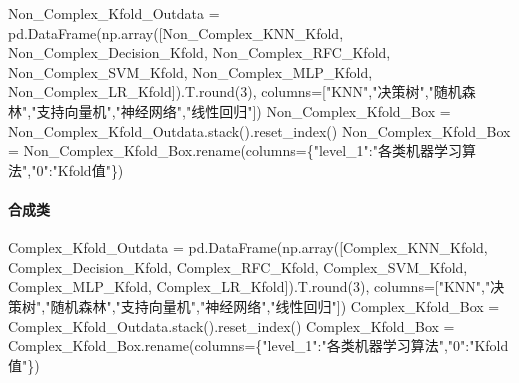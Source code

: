 \documentclass[
]{article}
\newenvironment{Shaded}{}{}
\newcommand{\BuiltInTok}[1]{#1}
\newcommand{\DecValTok}[1]{\textcolor[rgb]{0.25,0.63,0.44}{#1}}
\newcommand{\NormalTok}[1]{#1}
\newcommand{\OperatorTok}[1]{\textcolor[rgb]{0.40,0.40,0.40}{#1}}
\newcommand{\StringTok}[1]{\textcolor[rgb]{0.25,0.44,0.63}{#1}}
\begin{document}
\begin{Shaded}
\begin{Highlighting}[]
\NormalTok{Non\_Complex\_Kfold\_Outdata }\OperatorTok{=}\NormalTok{ pd.DataFrame(np.array([Non\_Complex\_KNN\_Kfold,}
\NormalTok{                                                   Non\_Complex\_Decision\_Kfold,}
\NormalTok{                                                   Non\_Complex\_RFC\_Kfold,}
\NormalTok{                                                   Non\_Complex\_SVM\_Kfold,}
\NormalTok{                                                   Non\_Complex\_MLP\_Kfold,}
\NormalTok{                                                   Non\_Complex\_LR\_Kfold]).T.}\BuiltInTok{round}\NormalTok{(}\DecValTok{3}\NormalTok{),}
\NormalTok{                                         columns}\OperatorTok{=}\NormalTok{[}\StringTok{"KNN"}\NormalTok{,}\StringTok{"决策树"}\NormalTok{,}\StringTok{"随机森林"}\NormalTok{,}\StringTok{"支持向量机"}\NormalTok{,}\StringTok{"神经网络"}\NormalTok{,}\StringTok{"线性回归"}\NormalTok{])}
\NormalTok{Non\_Complex\_Kfold\_Box }\OperatorTok{=}\NormalTok{ Non\_Complex\_Kfold\_Outdata.stack().reset\_index()}
\NormalTok{Non\_Complex\_Kfold\_Box }\OperatorTok{=}\NormalTok{ Non\_Complex\_Kfold\_Box.rename(columns}\OperatorTok{=}\NormalTok{\{}\StringTok{"level\_1"}\NormalTok{:}\StringTok{"各类机器学习算法"}\NormalTok{,}\StringTok{"0"}\NormalTok{:}\StringTok{"Kfold值"}\NormalTok{\})}
\end{Highlighting}
\end{Shaded}

\hypertarget{header-n332}{%
\paragraph{合成类}\label{header-n332}}

\begin{Shaded}
\begin{Highlighting}[]
\NormalTok{Complex\_Kfold\_Outdata }\OperatorTok{=}\NormalTok{ pd.DataFrame(np.array([Complex\_KNN\_Kfold,}
\NormalTok{                                                   Complex\_Decision\_Kfold,}
\NormalTok{                                                   Complex\_RFC\_Kfold,}
\NormalTok{                                                   Complex\_SVM\_Kfold,}
\NormalTok{                                                   Complex\_MLP\_Kfold,}
\NormalTok{                                                   Complex\_LR\_Kfold]).T.}\BuiltInTok{round}\NormalTok{(}\DecValTok{3}\NormalTok{),}
\NormalTok{                                         columns}\OperatorTok{=}\NormalTok{[}\StringTok{"KNN"}\NormalTok{,}\StringTok{"决策树"}\NormalTok{,}\StringTok{"随机森林"}\NormalTok{,}\StringTok{"支持向量机"}\NormalTok{,}\StringTok{"神经网络"}\NormalTok{,}\StringTok{"线性回归"}\NormalTok{])}
\NormalTok{Complex\_Kfold\_Box }\OperatorTok{=}\NormalTok{ Complex\_Kfold\_Outdata.stack().reset\_index()}
\NormalTok{Complex\_Kfold\_Box }\OperatorTok{=}\NormalTok{ Complex\_Kfold\_Box.rename(columns}\OperatorTok{=}\NormalTok{\{}\StringTok{"level\_1"}\NormalTok{:}\StringTok{"各类机器学习算法"}\NormalTok{,}\StringTok{"0"}\NormalTok{:}\StringTok{"Kfold值"}\NormalTok{\})}
\end{Highlighting}
\end{Shaded}
\end{document}
